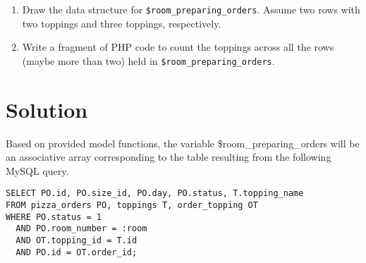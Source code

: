 \begin{enumerate}[label=(\alph*)]
\item Draw the data structure for \texttt{\$room\_preparing\_orders}. Assume two rows with two toppings and three toppings, respectively.

\item Write a fragment of PHP code to count the toppings across all the rows (maybe more than two) held in \texttt{\$room\_preparing\_orders}.
\end{enumerate}

\section*{Solution}

Based on provided model functions, the variable \$room\_preparing\_orders will be an associative array corresponding to the table resulting from the following MySQL query.
\lstset{language=SQL}
\begin{lstlisting}
SELECT PO.id, PO.size_id, PO.day, PO.status, T.topping_name
FROM pizza_orders PO, toppings T, order_topping OT
WHERE PO.status = 1
  AND PO.room_number = :room
  AND OT.topping_id = T.id
  AND PO.id = OT.order_id;
\end{lstlisting}

